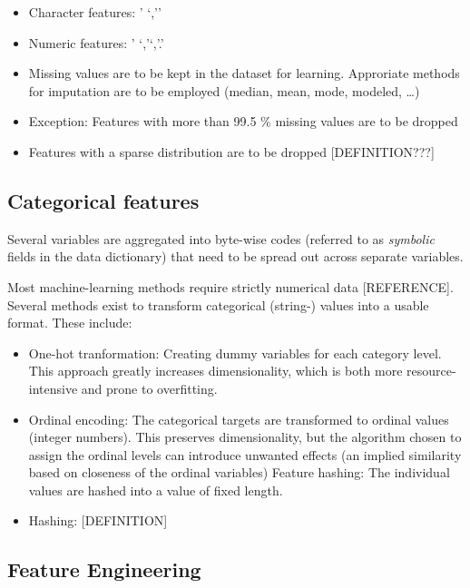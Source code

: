\documentclass[
  11pt,
  a4paper,
  DIV=12,captions=tableheading,oneside]{scrbook}
\providecommand{\tightlist}{%
  \setlength{\itemsep}{0pt}\setlength{\parskip}{0pt}}
\providecommand{\tightlist}{%
  \setlength{\itemsep}{0pt}\setlength{\parskip}{0pt}}
\begin{document}
\begin{itemize}
\tightlist
\item
  Character features: ' `,''
\item
  Numeric features: ' `,'`,'.'
\item
  Missing values are to be kept in the dataset for learning. Approriate methods for imputation are to be employed (median, mean, mode, modeled, \ldots{})
\item
  Exception: Features with more than 99.5 \% missing values are to be dropped
\item
  Features with a sparse distribution are to be dropped {[}DEFINITION???{]}
\end{itemize}

\hypertarget{categorical-features}{%
\subsection{Categorical features}\label{categorical-features}}

Several variables are aggregated into byte-wise codes (referred to as \emph{symbolic} fields in the data dictionary) that need to be spread out across separate variables.

Most machine-learning methods require strictly numerical data {[}REFERENCE{]}. Several methods exist to transform categorical (string-) values into a usable format. These include:

\begin{itemize}
\tightlist
\item
  One-hot tranformation: Creating dummy variables for each category level.
  This approach greatly increases dimensionality, which is both more resource-intensive and prone to overfitting.
\item
  Ordinal encoding: The categorical targets are transformed to ordinal values (integer numbers). This preserves dimensionality, but the algorithm chosen to assign the ordinal levels can introduce unwanted effects (an implied similarity based on closeness of the ordinal variables)
  Feature hashing: The individual values are hashed into a value of fixed length.
\item
  Hashing: {[}DEFINITION{]}
\end{itemize}

\hypertarget{feature-engineering-1}{%
\subsection{Feature Engineering}\label{feature-engineering-1}}
\end{document}
